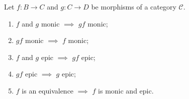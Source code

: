 Let $f : B \to C$ and $g : C \to D$ be morphisms of a category $\mathcal{C}$.
\begin{enumerate}
\item[(i)] $f$ and $g$ monic $\implies$ $gf$ monic;
\item[(ii)] $gf$ monic $\implies$ $f$ monic;
\item[(iii)] $f$ and $g$ epic $\implies$ $gf$ epic;
\item[(iv)] $gf$ epic $\implies$ $g$ epic;
\item[(v)] $f$ is an equivalence $\implies$ $f$ is monic and epic.
\end{enumerate}
